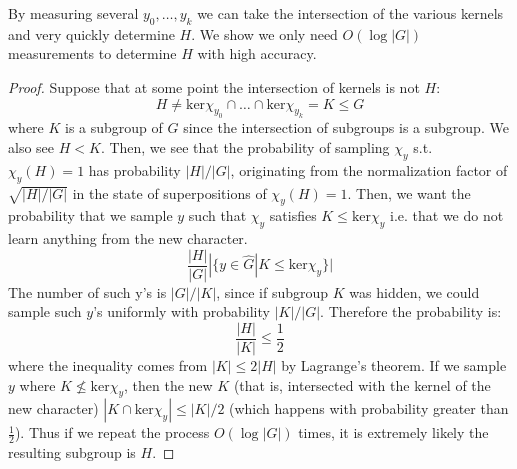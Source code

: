 \documentclass{article}
\begin{document}
\begin{enumerate}
	By measuring several $y_0, \dots, y_k$ we can take the intersection of the various kernels and very quickly determine $H$. We show we only need $O(\log|G|)$ measurements to determine $H$ with high accuracy.
	\begin{proof}
		Suppose that at some point the intersection of kernels is not $H$:
		$$H \neq \text{ker} \chi_{y_0} \cap \dots \cap \text{ker} \chi_{y_k} = K \leq G$$
		where $K$ is a subgroup of $G$ since the intersection of subgroups is a subgroup. We also see $H< K$. Then, we see that the probability of sampling $\chi_y$ s.t. $\chi_y(H) = 1$ has probability $|H|/|G|$, originating from the normalization factor of $\sqrt{|H|/|G|}$ in the state of superpositions of $\chi_y(H) = 1$. Then, we want the probability that we sample $y$ such that $\chi_y$ satisfies $K \leq \text{ker} \chi_y$ i.e. that we do not learn anything from the new character. 
		$$\frac{|H|}{|G|} |\{ y\in \hat{G} | K \leq \text{ker} \chi_y\}|$$
		The number of such y's is $|G|/|K|$, since if subgroup $K$ was hidden, we could sample such $y$'s uniformly with probability $|K|/|G|$. Therefore the probability is:
		$$\frac{|H|}{|K|} \leq \frac12$$
		where the inequality comes from $|K| \leq 2|H|$ by Lagrange's theorem. If we sample $y$ where $K \not \leq \text{ker} \chi_y$, then the new $K$ (that is, intersected with the kernel of the new character) $|K \cap \text{ker} \chi_y| \leq |K|/2$ (which happens with probability greater than $\frac12$). Thus if we repeat the process $O(\log |G|)$ times, it is extremely likely the resulting subgroup is $H$.
	\end{proof}
\end{enumerate} 
\end{document}
